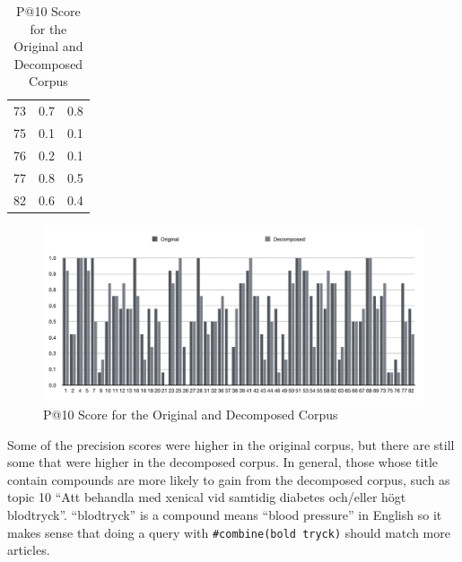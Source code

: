 \documentclass[11pt]{article} %
\begin{document}
\begin{table}[h]
\begin{center}
\begin{tabular}{c|c|c|}
            73  & 0.7               & 0.8               \\
            75  & 0.1               & 0.1               \\
            76  & 0.2               & 0.1               \\
            77  & 0.8               & 0.5               \\
            82  & 0.6               & 0.4               \\
        \end{tabular}
        \caption{P@10 Score for the Original and Decomposed Corpus}
    \end{center}
\end{table}

\begin{figure}[h]
    \centering
    \includegraphics[width=1\textwidth]{p_at_10.png}
    \caption{P@10 Score for the Original and Decomposed Corpus}
\end{figure}

Some of the precision scores were higher in the original corpus, but there are still some that were higher in the decomposed corpus. In general, those whose title contain compounds are more likely to gain from the decomposed corpus, such as topic 10 ``Att behandla med xenical vid samtidig diabetes och/eller högt blodtryck''. ``blodtryck'' is a compound means ``blood pressure'' in English so it makes sense that doing a query with \verb|#combine(bold tryck)| should match more articles.
\end{document}
